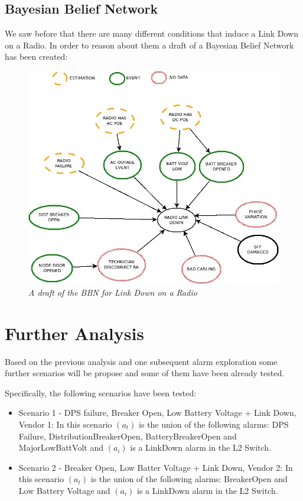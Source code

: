 \documentclass[10pt,a4paper]{article}
\begin{document}
\subsection{Bayesian Belief Network}
We saw before that there are many different conditions that induce a Link Down on a Radio. In order to reason about them a draft of a Bayesian Belief Network has been created:

\begin{figure}[H]
 \includegraphics[scale=0.5]{LinkDownBBN.png}
  \centering
  \caption{\textit{A draft of the BBN for Link Down on a Radio}}
  \label{fig:LinkDownBBN}
\end{figure}	

\newpage
\section{Further Analysis}
Based on the previous analysis and one subsequent alarm exploration some further scenarios will be propose and some of them have been already tested.

Specifically, the following scenarios have been tested:

\begin{itemize}
\item Scenario 1 - DPS failure, Breaker Open, Low Battery Voltage + Link Down, Vendor 1: In this scenario $(a_t)$ is the union of the following alarms: DPS Failure, DistributionBreakerOpen, BatteryBreakerOpen and MajorLowBattVolt and $(a_i)$ is a LinkDown alarm in the L2 Switch.
\item Scenario 2 - Breaker Open, Low Batter Voltage + Link Down, Vendor 2: In this scenario $(a_t)$ is the union of the following alarms: BreakerOpen and Low Battery Voltage and $(a_i)$ is a LinkDown alarm in the L2 Switch.
\end{itemize}
\end{document}
